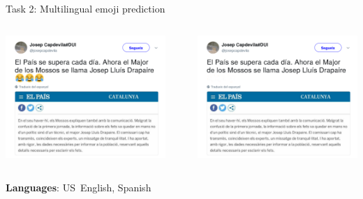 \documentclass[10pt, compress]{beamer}
\begin{document}
\begin{frame}{Task 2: Multilingual emoji prediction}
\begin{columns}
\begin{column}{0.45\textwidth}
\centering
\includegraphics[width=\textwidth]{graphics/twitter-capdevila.png}
\end{column}
\begin{column}{0.1\textwidth}
\centering
{\Large 
$\rightarrow$
}
\end{column}
\begin{column}{0.45\textwidth}
\centering
\includegraphics[width=\textwidth]{graphics/twitter-capdevila-noemoji.png}
\end{column}
\end{columns}

\textbf{Languages}: US~English, Spanish

\end{frame}
\end{document}
